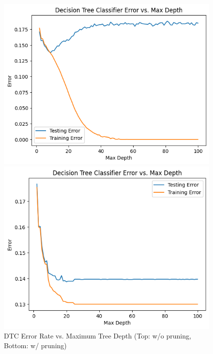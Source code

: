 \documentclass[12pt, letterpaper]{article}
\begin{document}
\begin{figure}[ht]
    \centering
    \begin{minipage}{0.5\textwidth}
        \centering
        \includegraphics[width=\textwidth]{dt/dt2.png} %
    \end{minipage}\hfill
    \begin{minipage}{0.5\textwidth}
        \centering
        \includegraphics[width=\textwidth]{dt/dt4.png} %
    \end{minipage}
    \caption{DTC Error Rate vs. Maximum Tree Depth (Top: w/o pruning,
            Bottom: w/ pruning)}
    \label{fig:dt1}
\end{figure}
\end{document}
